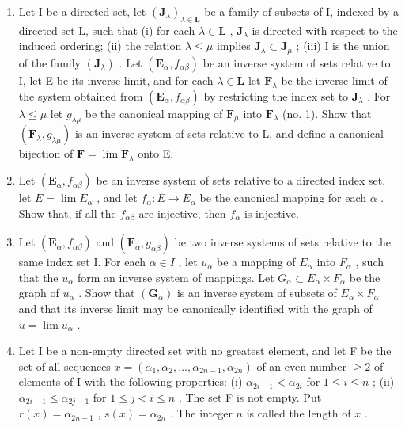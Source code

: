 \exercisegroup

\begin{enumerate}
\def\labelenumi{\arabic{enumi}.}
\item
  Let I be a directed set, let \((\mathbf{J}_{\lambda})_{\lambda \in \mathbf{L}}\) be a family of subsets of I, indexed by a directed set L, such that (i) for each \(\lambda \in \mathbf{L}\) , \(\mathbf{J}_{\lambda}\) is directed with respect to the induced ordering; (ii) the relation \(\lambda \leqslant \mu\) implies \(\mathbf{J}_{\lambda} \subset \mathbf{J}_{\mu}\) ; (iii) I is the union of the family \((\mathbf{J}_{\lambda})\) . Let \((\mathbf{E}_{\alpha}, f_{\alpha\beta})\) be an inverse system of sets relative to I, let E be its inverse limit, and for each \(\lambda \in \mathbf{L}\) let \(\mathbf{F}_{\lambda}\) be the inverse limit of the system obtained from \((\mathbf{E}_{\alpha}, f_{\alpha\beta})\) by restricting the index set to \(\mathbf{J}_{\lambda}\) . For \(\lambda \leqslant \mu\) let \(g_{\lambda \mu}\) be the canonical mapping of \(\mathbf{F}_{\mu}\) into \(\mathbf{F}_{\lambda}\) (no. 1). Show that \((\mathbf{F}_{\lambda}, g_{\lambda \mu})\) is an inverse system of sets relative to L, and define a canonical bijection of \(\mathbf{F} = \lim \mathbf{F}_{\lambda}\) onto E.
\item
  Let \((\mathbf{E}_{\alpha}, f_{\alpha\beta})\) be an inverse system of sets relative to a directed index set, let \(E = \lim E_{\alpha}\) , and let \(f_{\alpha}: E \to E_{\alpha}\) be the canonical mapping for each \(\alpha\) . Show that, if all the \(f_{\alpha\beta}\) are injective, then \(f_{\alpha}\) is injective.
\item
  Let \((\mathbf{E}_{\alpha}, f_{\alpha\beta})\) and \((\mathbf{F}_{\alpha}, g_{\alpha\beta})\) be two inverse systems of sets relative to the same index set I. For each \(\alpha \in I\) , let \(u_{\alpha}\) be a mapping of \(E_{\alpha}\) into \(F_{\alpha}\) , such that the \(u_{\alpha}\) form an inverse system of mappings. Let \(G_{\alpha} \subset E_{\alpha} \times F_{\alpha}\) be the graph of \(u_{\alpha}\) . Show that \((\mathbf{G}_{\alpha})\) is an inverse system of subsets of \(E_{\alpha} \times F_{\alpha}\) and that its inverse limit may be canonically identified with the graph of \(u = \lim u_{\alpha}\) .
\item
  Let I be a non-empty directed set with no greatest element, and let F be the set of all sequences \(x = (\alpha_1, \alpha_2, \ldots, \alpha_{2n-1}, \alpha_{2n})\) of an even number \(\geqslant 2\) of elements of I with the following properties: (i) \(\alpha_{2i-1} < \alpha_{2i}\) for \(1 \leqslant i \leqslant n\) ; (ii) \(\alpha_{2i-1} \leqslant \alpha_{2j-1}\) for \(1 \leqslant j < i \leqslant n\) . The set F is not empty. Put \(r(x) = \alpha_{2n-1}\) , \(s(x) = \alpha_{2n}\) . The integer \(n\) is called the length of \(x\) .
\end{enumerate}

